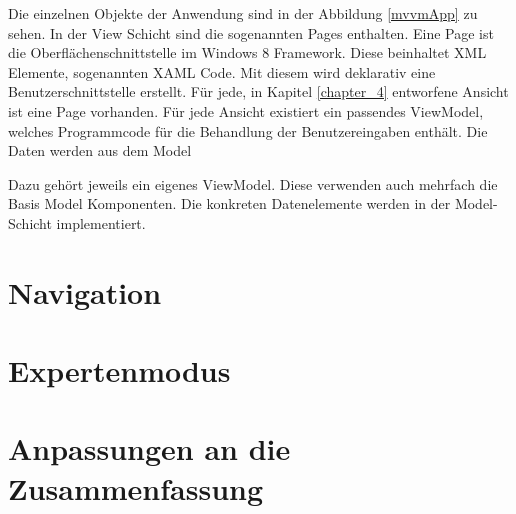 Die einzelnen Objekte der Anwendung sind in der Abbildung \ref{mvvmApp} zu sehen. In der View Schicht sind die sogenannten Pages enthalten. Eine Page ist die Oberflächenschnittstelle im Windows 8 Framework.  Diese beinhaltet XML Elemente, sogenannten XAML Code. Mit diesem wird deklarativ eine Benutzerschnittstelle erstellt. Für jede, in Kapitel \ref{chapter_4} entworfene Ansicht ist eine Page vorhanden. Für jede Ansicht existiert ein passendes ViewModel, welches Programmcode für die Behandlung der Benutzereingaben enthält. Die Daten werden aus dem Model

Dazu gehört jeweils ein eigenes ViewModel.  Diese verwenden auch mehrfach die Basis Model Komponenten. Die konkreten Datenelemente werden in der Model-Schicht implementiert. 


\section{Navigation}
\section{Expertenmodus}
\section{Anpassungen an die Zusammenfassung}
